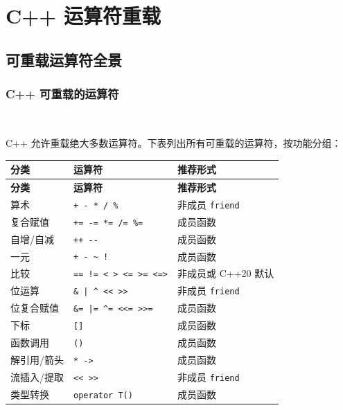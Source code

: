 \documentclass[12pt,a4paper,fontset=fandol]{ctexbook}
\newcommand{\cpp}[1]{C++#1}
\newcommand{\cpplabel}{%
  \noindent\begin{tcolorbox}[sharp corners,colback=algheadbg,colframe=algheadbg,
    left=6pt,right=6pt,top=2pt,bottom=2pt,boxrule=0pt]
  \textcolor{white}{\small\bfseries\sffamily C++}\end{tcolorbox}%
}
\begin{document}
\part{C++ 运算符重载}

\chapter{可重载运算符全景}

\section{C++ 可重载的运算符}

\cpplabel

\cpp{} 允许重载绝大多数运算符。下表列出所有可重载的运算符，按功能分组：

\begin{longtable}{lll}
\toprule
\textbf{分类} & \textbf{运算符} & \textbf{推荐形式} \\
\midrule
\endfirsthead
\toprule
\textbf{分类} & \textbf{运算符} & \textbf{推荐形式} \\
\midrule
\endhead
\bottomrule
\endfoot

算术 & \texttt{+ - * / \%} & 非成员 \texttt{friend} \\
复合赋值 & \texttt{+= -= *= /= \%=} & 成员函数 \\
自增/自减 & \texttt{++ -{}-} & 成员函数 \\
一元 & \texttt{+ - \textasciitilde{} !} & 成员函数 \\
比较 & \texttt{== != < > <= >= <=>} & 非成员或 \cpp{20} 默认 \\
位运算 & \texttt{\& | \^{} << >>} & 非成员 \texttt{friend} \\
位复合赋值 & \texttt{\&= |= \^{}= <<= >>=} & 成员函数 \\
下标 & \texttt{[]} & 成员函数 \\
函数调用 & \texttt{()} & 成员函数 \\
解引用/箭头 & \texttt{* ->} & 成员函数 \\
流插入/提取 & \texttt{<< >>} & 非成员 \texttt{friend} \\
类型转换 & \texttt{operator T()} & 成员函数 \\
\end{longtable}
\end{document}

